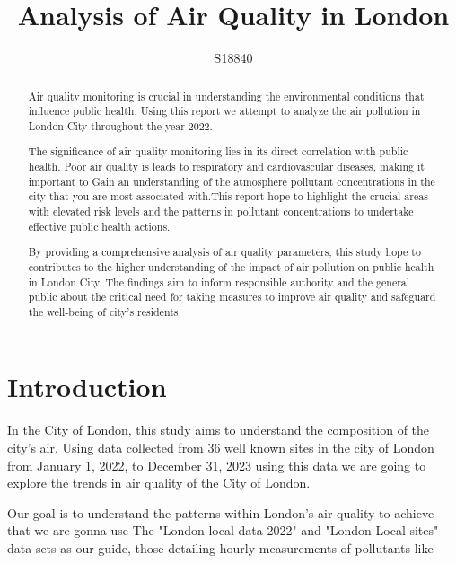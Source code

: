 \documentclass[]{article}
\title{Analysis of Air Quality in London}
\author{S18840}
\begin{document}
\maketitle

\vspace{50pt}
\begin{abstract}
	
	Air quality monitoring is crucial in understanding the environmental conditions that influence public health. Using this report we attempt to analyze the air pollution in London City throughout the year 2022.
	
	The significance of air quality monitoring lies in its direct correlation with public health. Poor air quality is leads to respiratory and cardiovascular diseases, making it important to Gain an understanding of the atmosphere pollutant concentrations in the city that you are most associated with.This report hope to highlight the crucial areas with elevated risk levels and the patterns in pollutant concentrations to undertake effective public health actions.
	
	By providing a comprehensive analysis of air quality parameters, this study hope to contributes to the higher understanding of the impact of air pollution on public health in London City. The findings aim to inform responsible authority and the general public about the critical need for taking measures to improve air quality and safeguard the well-being of city's residents
	
\end{abstract}

\pagebreak

\section*{Introduction}

In the City of London, this study aims to understand the composition of the city's air. Using data collected from 36 well known sites in the city of London from January 1, 2022, to December 31, 2023 using this data we are going to explore the trends in air quality of the City of London.

Our goal is to understand the patterns within London's air quality to achieve that we are gonna use The "London local data 2022" and "London Local sites" data sets as our guide,  those detailing hourly measurements of pollutants like 
\end{document}
